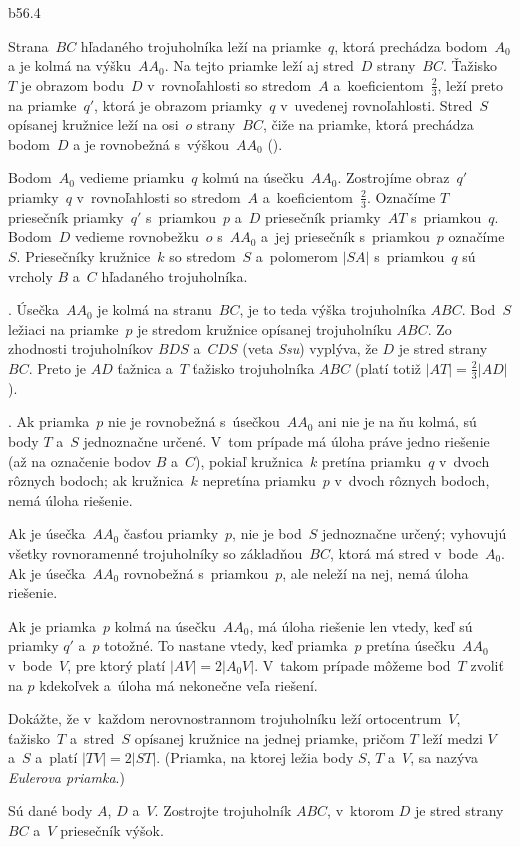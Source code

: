 {%
\epsplace b56.4 \hfil\Obr

Strana~$BC$ hľadaného trojuholníka leží na priamke~$q$, ktorá prechádza bodom~$A_0$ a je kolmá na výšku~$AA_0$. Na tejto priamke leží aj stred~$D$ strany~$BC$. Ťažisko~$T$ je obrazom bodu~$D$ v~rovnoľahlosti so stredom~$A$ a~koeficientom~$\frac23$, leží preto na priamke~$q'$, ktorá je obrazom priamky~$q$ v~uvedenej rovnoľahlosti. Stred~$S$ opísanej kružnice leží na osi~$o$ strany~$BC$, čiže na priamke, ktorá prechádza bodom~$D$ a je rovnobežná s~výškou~$AA_0$ (\obr).

\inspicture{}

\konstrukcia
Bodom~$A_0$ vedieme priamku~$q$ kolmú na úsečku~$AA_0$. Zostrojíme obraz~$q'$ priamky~$q$ v~rovnoľahlosti so stredom~$A$ a~koeficientom~$\frac23$. Označíme $T$ priesečník priamky~$q'$ s~priamkou~$p$ a~$D$ priesečník priamky~$AT$ s~priamkou~$q$. Bodom~$D$ vedieme rovnobežku~$o$ s~$AA_0$ a~jej priesečník s~priamkou~$p$ označíme~$S$. Priesečníky kružnice~$k$ so stredom~$S$ a~polomerom $|SA|$ s~priamkou~$q$ sú vrcholy $B$ a~$C$ hľadaného trojuholníka.

.
Úsečka~$AA_0$ je kolmá na stranu~$BC$, je to teda výška trojuholníka $ABC$. Bod~$S$ ležiaci na priamke~$p$ je stredom kružnice opísanej trojuholníku $ABC$. Zo zhodnosti trojuholníkov $BDS$ a~$CDS$ (veta {\it Ssu}) vyplýva, že $D$ je stred strany~$BC$. Preto je $AD$ ťažnica a~$T$ ťažisko trojuholníka $ABC$ (platí totiž $|AT|=\frac23 |AD|$).

.
Ak priamka~$p$ nie je rovnobežná s~úsečkou~$AA_0$ ani nie je na ňu kolmá, sú body $T$ a~$S$ jednoznačne určené. V~tom prípade má úloha práve jedno riešenie (až na označenie bodov $B$ a~$C$), pokiaľ kružnica~$k$ pretína priamku~$q$ v~dvoch rôznych bodoch; ak kružnica~$k$ nepretína priamku~$p$ v~dvoch rôznych bodoch, nemá úloha riešenie.

Ak je úsečka~$AA_0$ časťou priamky~$p$, nie je bod~$S$ jednoznačne určený; vyhovujú všetky rovnoramenné trojuholníky so základňou~$BC$, ktorá má stred v~bode~$A_0$. Ak je úsečka~$AA_0$ rovnobežná s~priamkou~$p$, ale neleží na nej, nemá úloha riešenie.

Ak je priamka~$p$ kolmá na úsečku~$AA_0$, má úloha riešenie len vtedy, keď sú priamky $q'$ a~$p$ totožné. To nastane vtedy, keď priamka~$p$ pretína úsečku~$AA_0$ v~bode~$V$, pre ktorý platí $|AV|=2|A_0V|$. V~takom prípade môžeme bod~$T$ zvoliť na $p$ kdekoľvek a~úloha má nekonečne veľa riešení.

Dokážte, že v~každom nerovnostrannom trojuholníku leží ortocentrum~$V$, ťažisko~$T$ a~stred~$S$ opísanej kružnice na jednej priamke, pričom $T$ leží medzi $V$ a~$S$ a~platí $|TV|=2|ST|$. (Priamka, na ktorej ležia body $S$, $T$ a~$V$, sa nazýva {\it Eulerova priamka}.)

Sú dané body $A$, $D$ a~$V$. Zostrojte trojuholník $ABC$, v~ktorom $D$ je stred strany $BC$ a~$V$ priesečník výšok.

}

